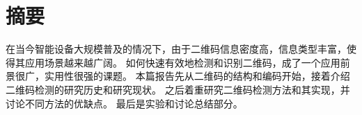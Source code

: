 \section{摘要}
在当今智能设备大规模普及的情况下，由于二维码信息密度高，信息类型丰富，使得其应用场景越来越广阔。
如何快速有效地检测和识别二维码，成了一个应用前景很广，实用性很强的课题。
本篇报告先从二维码的结构和编码开始，接着介绍二维码检测的研究历史和研究现状。
之后着重研究二维码检测方法和其实现，并讨论不同方法的优缺点。
最后是实验和讨论总结部分。